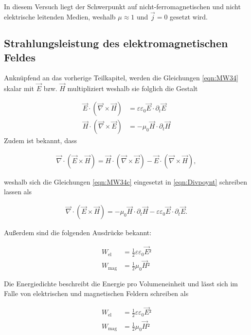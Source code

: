 \noindent In diesem Versuch liegt der Schwerpunkt auf nicht-ferromagnetischen und nicht elektrische leitenden Medien, weshalb $\mu \approx 1$ und $\vec{j} = 0$
gesetzt wird.  

\subsection{Strahlungsleistung des elektromagnetischen Feldes}

Anknüpfend an das vorherige Teilkapitel, werden die Gleichungen \eqref{eqn:MW34} skalar mit $\vec{E}$ bzw. $\vec{H}$ multipliziert weshalb sie folglich die Gestalt 

\begin{align}
\label{eqn:MW34c}
    \vec{E}\cdot\left(\vec{\nabla}\times\vec{H}\right) &= \varepsilon\varepsilon_0\vec{E}\cdot\partial_{t}\vec{E}\\
    \vec{H}\cdot\left(\vec{\nabla}\times\vec{E}\right) &= -\mu_0\vec{H}\cdot\partial_{t}\vec{H}
\end{align}
\newpage
\noindent Zudem ist bekannt, dass

\begin{align}
    \vec{\nabla}\cdot\left(\vec{E}\times\vec{H}\right) = \vec{H}\cdot\left(\vec{\nabla}\times\vec{E}\right) - \vec{E}\cdot\left(\vec{\nabla}\times\vec{H}\right),
    \label{eqn:Divpoynt}
\end{align}

\noindent weshalb sich die Gleichungen \eqref{eqn:MW34c} eingesetzt in \eqref{eqn:Divpoynt} schreiben lassen als

\begin{align}
\label{eqn:Divpoyntzsm}
    \vec{\nabla}\cdot\left(\vec{E}\times\vec{H}\right) = -\mu_0\vec{H}\cdot\partial_t\vec{H} - \varepsilon\varepsilon_0\vec{E}\cdot\partial_t\vec{E}.
\end{align}

\noindent Außerdem sind die folgenden Ausdrücke bekannt:

\begin{align}
    W_\text{el} &= \frac{1}{2}\varepsilon\varepsilon_0\vec{E}²\\
    W_\text{mag} &= \frac{1}{2}\mu_0\vec{H}²
\label{eqn:}
\end{align}

\noindent Die Energiedichte beschreibt die Energie pro Volumeneinheit und lässt sich im Falle von elektrischen und magnetischen Feldern schreiben als 

\begin{align}
\label{eqn:Energiedichten}
    W_\text{el} &= \frac{1}{2}\varepsilon\varepsilon_0\vec{E}²\\
    W_\text{mag} &= \frac{1}{2}\mu_0\vec{H}²
\end{align}

